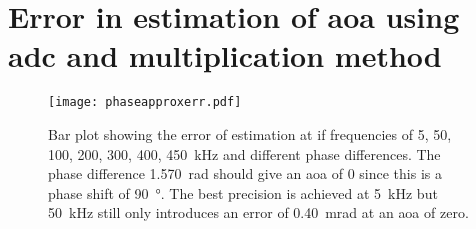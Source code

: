 \graphicspath{{figures/appendix/}}
\chapter{Error in estimation of \gls{aoa} using \gls{adc} and multiplication method}\label{appendix:aoaestimationerr}
\begin{figure} [h]
\centering
\texttt{[image: phaseapproxerr.pdf]}
\caption{Bar plot showing the error of estimation at \gls{if} frequencies of  5, 50, 100, 200, 300, 400, \SI{450}{\kilo\hertz} and different phase differences. The phase difference \SI{1.570}{\radian} should give an \gls{aoa} of 0 since this is a phase shift of \SI{90}{\degree}. The best precision is achieved at \SI{5}{\kilo\hertz} but \SI{50}{\kilo\hertz} still only introduces an error of \SI{0.40}{\milli\radian} at an \gls{aoa} of zero.}
\label{fig:app:aoaestimationerr}
\end{figure}